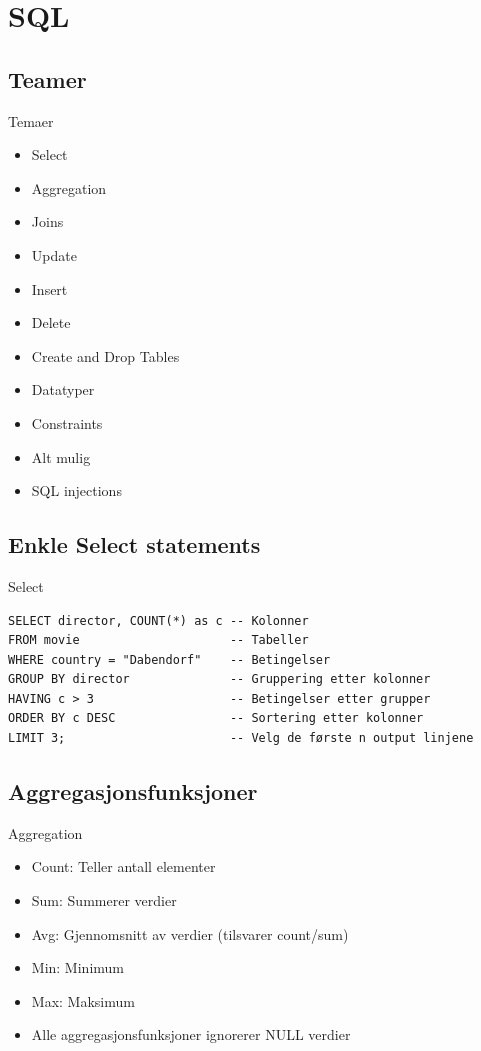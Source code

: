 \section{SQL}
\subsection*{Teamer}
\begin{frame}{Temaer}
\begin{itemize}
    \item Select
    \item Aggregation
    \item Joins
    \item Update
    \item Insert
    \item Delete
    \item Create and Drop Tables
    \item Datatyper
    \item Constraints
    \item Alt mulig
    \item SQL injections
\end{itemize}
\end{frame}

\subsection*{Enkle Select statements}
\begin{frame}[fragile]{Select}
\begin{verbatim}
SELECT director, COUNT(*) as c -- Kolonner
FROM movie                     -- Tabeller
WHERE country = "Dabendorf"    -- Betingelser
GROUP BY director              -- Gruppering etter kolonner 
HAVING c > 3                   -- Betingelser etter grupper
ORDER BY c DESC                -- Sortering etter kolonner
LIMIT 3;                       -- Velg de første n output linjene
\end{verbatim}
\end{frame}

\subsection*{Aggregasjonsfunksjoner}
\begin{frame}[fragile]{Aggregation}
\begin{itemize}[<+->]
    \item Count: Teller antall elementer
    \item Sum: Summerer verdier
    \item Avg: Gjennomsnitt av verdier (tilsvarer count/sum)
    \item Min: Minimum
    \item Max: Maksimum
    \item Alle aggregasjonsfunksjoner ignorerer NULL verdier
\end{itemize}
\end{frame}


